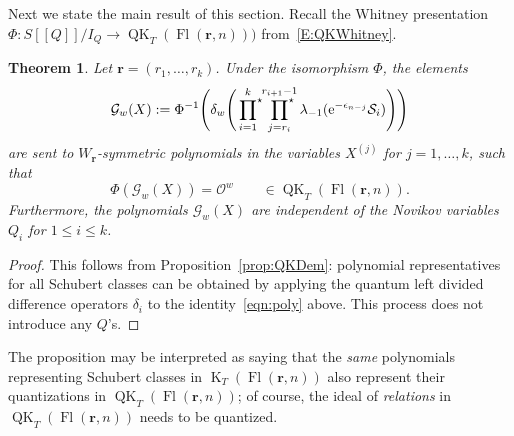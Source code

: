 \documentclass[pdftex]{sigma}
\numberwithin{equation}{section}
\newtheorem{Theorem}{Theorem}[section]
\theoremstyle{definition}
\newcommand{\dbb}[1]{[\![#1]\!]}
\DeclareMathOperator{\Fl}{Fl}
\DeclareMathOperator{\QK}{QK}
\DeclareMathOperator{\K}{K}
\newcommand{\bfr}{{\mathbf r}}
\newcommand{\cO}{{\mathcal O}}
\newcommand{\cS}{{\mathcal S}}
\begin{document}
Next we state the main result of this section.
Recall the Whitney presentation $\Phi\colon S\dbb{Q}/I_Q \to \QK_T(\Fl(\bfr,n)))$ from~\eqref{E:QKWhitney}.

\begin{Theorem}\label{thm:QKpolys} Let $\bfr = (r_1, \dots, r_k)$. Under the isomorphism $\Phi$, the elements
\[
\mathcal{G}_w(X):= \Phi^{-1}\Biggl(\delta_w\Biggl(\sideset{}{^\star}\prod_{i=1}^{k}\sideset{}{^\star}\prod_{j=r_i}^{r_{i+1}-1}\lambda_{-1}({\rm e}^{-\epsilon_{n-j}} \cS_i)\Biggr)\Biggr) \]
are sent to $W_{\bfr}$-symmetric polynomials in the variables
$X^{(j)}$ for $j=1, \dots , k$,
such that
\[ \Phi(\mathcal{G}_w(X)) = \cO^w \qquad \in \QK_T(\Fl(\bfr,n)) .\]
Furthermore, the polynomials $\mathcal{G}_w(X)$ are independent of the Novikov variables $Q_i$
for $1 \le i \le k$.\end{Theorem}
\begin{proof} This follows from Proposition~\ref{prop:QKDem}: polynomial representatives for all Schubert classes can be obtained by applying the quantum left divided difference operators $\delta_i$ to the identity~\eqref{eqn:poly} above. This process does not introduce any $Q$'s.
\end{proof}

The proposition may be interpreted as saying that the {\em same} polynomials representing
Schubert classes in $\K_T(\Fl(\bfr,n))$ also represent their quantizations in $\QK_T(\Fl(\bfr,n))$;
of course, the ideal of {\em relations} in $\QK_T(\Fl(\bfr,n))$ needs to be quantized.
\end{document}
